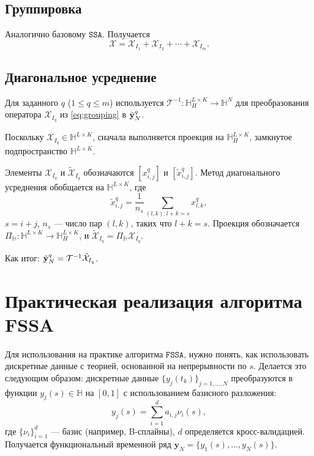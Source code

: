 \documentclass[12pt, specialist, subf
]{disser}
\theoremstyle{definition}
\newcommand{\SSA}{\texttt{SSA}}
\newcommand{\FSSA}{\texttt{FSSA}}
\begin{document}
\subsection*{Группировка}

Аналогично базовому $\SSA$. Получается
\begin{equation}\label{eq:grouping}
	\mathcal{X}=\mathcal{X}_{I_1}+\mathcal{X}_{I_2}+\cdots+\mathcal{X}_{I_m}.
\end{equation}


\subsection*{Диагональное усреднение}

Для заданного $q$ ($1\leq q\leq m$) используется $\mathcal{T}^{-1}:\mathbb{H}_H^{L\times K}\to\mathbb{H}^N$ для преобразования оператора $\mathcal{X}_{I_q}$ из \eqref{eq:grouping} в $\tilde{\bf y}_N^q$.

Поскольку $\mathcal{X}_{I_q}\in\mathbb{H}^{L\times K}$, сначала выполняется проекция на $\mathbb{H}_H^{L\times K}$, замкнутое подпространство $\mathbb{H}^{L\times K}$.

Элементы $\mathcal{X}_{I_q}$ и $\tilde{\mathcal{X}}_{I_q}$ обозначаются $[x_{i,j}^{q}]$ и $[\tilde{x}_{i,j}^{q}]$. Метод диагонального усреднения  обобщается на $\mathbb{H}^{L\times K}$, где
\begin{equation}\label{fdiag-ave}
	\tilde{x}_{i,j}^{q}=\frac{1}{n_s}\sum_{(l,k): l+k=s} x_{l,k}^q,
\end{equation}
$s=i+j$, $n_s$ — число пар $(l,k)$, таких что $l+k=s$. Проекция обозначается $\Pi_\mathbb{H}:\mathbb{H}^{L\times K}\to\mathbb{H}_H^{L\times K}$, и $\tilde{\mathcal{X}}_{I_q}=\Pi_\mathbb{H} \mathcal{X}_{I_q}$.

Как итог: $\tilde{\bf y}_N^q=\mathcal{T}^{-1}\tilde{\mathcal{X}}_{I_q}$.


\section{Практическая реализация алгоритма FSSA}

Для использования на практике алгоритма $\FSSA$, нужно понять, как использовать дискретные данные с теорией, основанной на непрерывности по $s$. Делается это следующим образом:
дискретные данные \( \{y_j(t_k)\}_{j=1,\dots,N} \) преобразуются в функции \( y_j(s) \in \mathbb{H} \) на \( [0,1] \) с использованием базисного разложения:
\[
	y_j(s) = \sum_{i=1}^d a_{i,j} \nu_i(s),
\]
где \( \{\nu_i\}_{i=1}^d \) — базис (например, B-сплайны), \( d \) определяется кросс-валидацией. Получается функциональный временной ряд \( \mathbf{y}_N = \{y_1(s), \dots, y_N(s)\} \).
\end{document}
